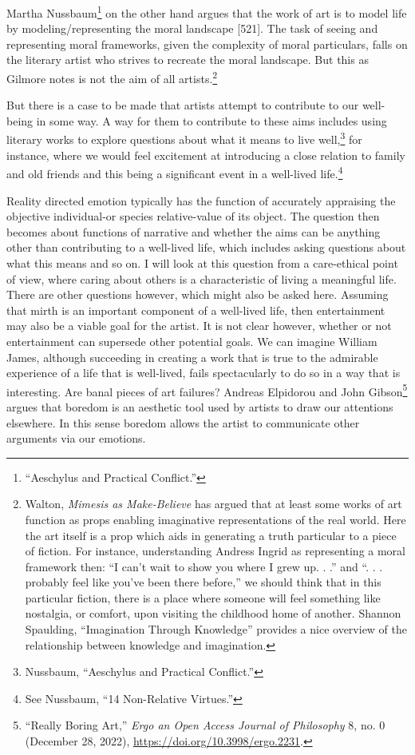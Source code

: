 \documentclass[phdthesis,12pt,final]{wuthesis}
\theoremstyle{definition}
\theoremstyle{definition}
\theoremstyle{definition}
\theoremstyle{definition}
\theoremstyle{remark}
\begin{document}
Martha Nussbaum\footnote{{``Aeschylus and Practical Conflict.''}} on the other hand argues that the work of art is to model life by modeling/representing the moral landscape {[}521{]}. The task of seeing and representing moral frameworks, given the complexity of moral particulars, falls on the literary artist who strives to recreate the moral landscape. But this as Gilmore notes is not the aim of all artists.\footnote{Walton, \emph{Mimesis as {Make-Believe}} has argued that at least some works of art function as props enabling imaginative representations of the real world. Here the art itself is a prop which aids in generating a truth particular to a piece of fiction. For instance, understanding Andress Ingrid as representing a moral framework then: ``I can't wait to show you where I grew up. . .'' and ``. . . probably feel like you've been there before,'' we should think that in this particular fiction, there is a place where someone will feel something like nostalgia, or comfort, upon visiting the childhood home of another. Shannon Spaulding, {``Imagination {Through Knowledge}''} provides a nice overview of the relationship between knowledge and imagination.}

But there is a case to be made that artists attempt to contribute to our well-being in some way. A way for them to contribute to these aims includes using literary works to explore questions about what it means to live well,\footnote{Nussbaum, {``Aeschylus and Practical Conflict.''}} for instance, where we would feel excitement at introducing a close relation to family and old friends and this being a significant event in a well-lived life.\footnote{See Nussbaum, {``14 {Non-Relative Virtues}.''}}

Reality directed emotion typically has the function of accurately appraising the objective individual-or species relative-value of its object. The question then becomes about functions of narrative and whether the aims can be anything other than contributing to a well-lived life, which includes asking questions about what this means and so on. I will look at this question from a care-ethical point of view, where caring about others is a characteristic of living a meaningful life. There are other questions however, which might also be asked here. Assuming that mirth is an important component of a well-lived life, then entertainment may also be a viable goal for the artist. It is not clear however, whether or not entertainment can supersede other potential goals. We can imagine William James, although succeeding in creating a work that is true to the admirable experience of a life that is well-lived, fails spectacularly to do so in a way that is interesting. Are banal pieces of art failures? Andreas Elpidorou and John Gibson\footnote{{``Really {Boring Art},''} \emph{Ergo an Open Access Journal of Philosophy} 8, no. 0 (December 28, 2022), \url{https://doi.org/10.3998/ergo.2231}.} argues that boredom is an aesthetic tool used by artists to draw our attentions elsewhere. In this sense boredom allows the artist to communicate other arguments via our emotions.
\end{document}
